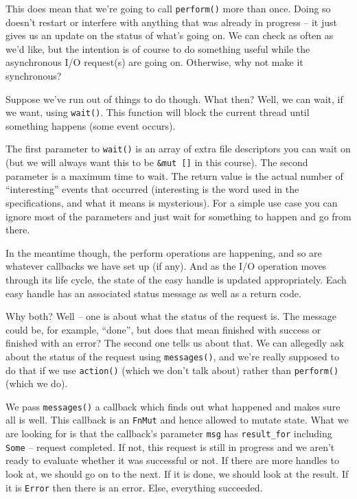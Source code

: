 This does mean that we're going to call \texttt{perform()} more than once. Doing so doesn't restart or interfere with anything that was already in progress -- it just gives us an update on the status of what's going on. We can check as often as we'd like, but the intention is of course to do something useful while the asynchronous I/O request(s) are going on. Otherwise, why not make it synchronous? 

Suppose we've run out of things to do though. What then? Well, we can wait, if we want, using \texttt{wait()}. This function will block the current thread until something happens (some event occurs).

The first parameter to \texttt{wait()} is an array of extra file descriptors you can wait on (but we will always want this to be \texttt{\&mut []} in this course). The second parameter is a maximum time to wait. The return value is the actual number of ``interesting'' events that occurred (interesting is the word used in the specifications, and what it means is mysterious). For a simple use case you can ignore most of the parameters and just wait for something to happen and go from there.

In the meantime though, the perform operations are happening, and so are whatever callbacks we have set up (if any). And as the I/O operation moves through its life cycle, the state of the easy handle is updated appropriately. Each easy handle has an associated status message as well as a return code.

Why both? Well -- one is about what the status of the request is. The message could be, for example, ``done'', but does that mean finished with success or finished with an error? The second one tells us about that. We can allegedly ask about the status of the request using \texttt{messages()}, and we're really supposed to do that if we use \texttt{action()} (which we don't talk about) rather than \texttt{perform()} (which we do).

We pass \texttt{messages()} a callback which finds out what happened and makes sure all is well. This callback is an \texttt{FnMut} and hence allowed to mutate state. What we are looking for is that the callback's parameter \texttt{msg} has \texttt{result\_for} including \texttt{Some} -- request completed. If not, this request is still in progress and we aren't ready to evaluate whether it was successful or not. If there are more handles to look at, we should go on to the next. If it is done, we should look at the result. If it is \texttt{Error} then there is an error. Else, everything succeeded.

